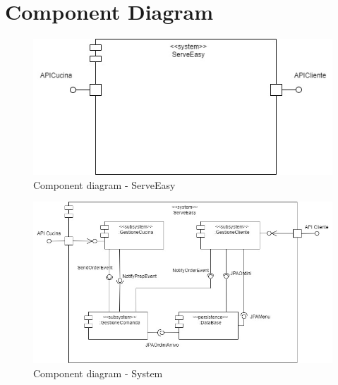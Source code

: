 \section{Component Diagram}
\begin{figure}[htbp]
	\centering
	\includegraphics[scale=0.6]{iterazione1/images/ServeEasy_componente_unico.jpg}
	\caption{Component diagram - ServeEasy\label{fig:component_diagram_serveeasy}}
\end{figure}

\begin{figure}[htbp]
	\centering
	\includegraphics[scale=0.5]{iterazione1/images/ServeEasy_primo_zoomin.jpg}
	\caption{Component diagram - System\label{fig:component_diagram_system}}
\end{figure}

